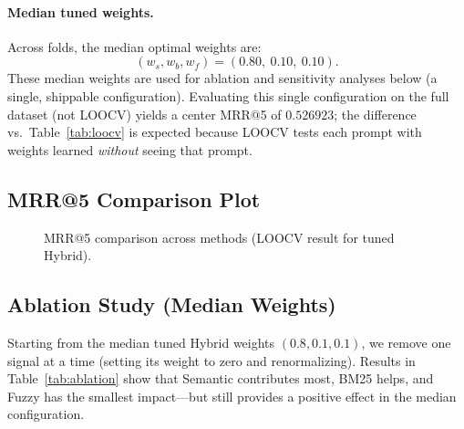\paragraph{Median tuned weights.} Across folds, the median optimal weights are:
\[
\boxed{(w_s,w_b,w_f) = (0.80,\ 0.10,\ 0.10)}.
\]
These median weights are used for ablation and sensitivity analyses below (a single, shippable configuration). Evaluating this single configuration on the full dataset (not LOOCV) yields a center MRR@5 of $0.526923$; the difference vs.\ Table~\ref{tab:loocv} is expected because LOOCV tests each prompt with weights learned \emph{without} seeing that prompt.

\subsection{MRR@5 Comparison Plot}
\begin{figure}[h]
\centering
{}
\caption{MRR@5 comparison across methods (LOOCV result for tuned Hybrid).}
\label{fig:mrr_bar}
\end{figure}

\subsection{Ablation Study (Median Weights)}
Starting from the median tuned Hybrid weights $(0.8,0.1,0.1)$, we remove one signal at a time (setting its weight to zero and renormalizing). Results in Table~\ref{tab:ablation} show that Semantic contributes most, BM25 helps, and Fuzzy has the smallest impact—but still provides a positive effect in the median configuration.


